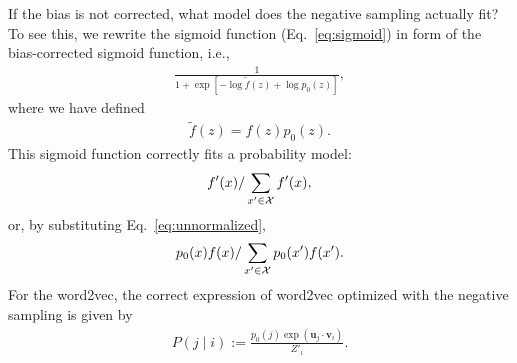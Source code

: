 \documentclass[12pt]{article} %
\def\given{\mid}
\def\ie{i.e.,~}
\begin{document}
If the bias is not corrected, what model does the negative sampling actually fit?
To see this, we rewrite the sigmoid function (Eq.~\eqref{eq:sigmoid}) in form of the bias-corrected sigmoid function, \ie
\begin{align}
    \label{eq:sigmoid3}
    \frac{1}{1 + \exp\left[ - \log \tilde f(z) + \log p_0(z)  \right]},
\end{align}
where we have defined
\begin{align}
    \label{eq:unnormalized}
    \tilde f(z) = f(z) p_0(z).
\end{align}
This sigmoid function correctly fits a probability model:
\begin{align}
    f'(x) / \sum_{x' \in {\cal X}} f'(x),
\end{align}
or, by substituting Eq.~\eqref{eq:unnormalized},
\begin{align}
    p_0(x)f(x) / \sum_{x' \in {\cal X}} p_0(x')f(x').
\end{align}
For the word2vec, the correct expression of word2vec optimized with the negative sampling is given by
\begin{align}
    P\left(j \given i \right):= \frac{p_0(j)\exp(\bm{u}_j \cdot \bm{v}_{i})}{Z'_i}.
\end{align}




\end{document}
